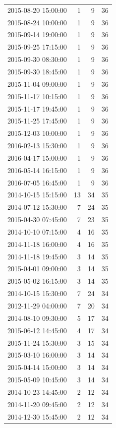 \begin{tabular}{lrrr}
2015-08-20 15:00:00 & 1 & 9 & 36 \\
2015-08-24 10:00:00 & 1 & 9 & 36 \\
2015-09-14 19:00:00 & 1 & 9 & 36 \\
2015-09-25 17:15:00 & 1 & 9 & 36 \\
2015-09-30 08:30:00 & 1 & 9 & 36 \\
2015-09-30 18:45:00 & 1 & 9 & 36 \\
2015-11-04 09:00:00 & 1 & 9 & 36 \\
2015-11-17 10:15:00 & 1 & 9 & 36 \\
2015-11-17 19:45:00 & 1 & 9 & 36 \\
2015-11-25 17:45:00 & 1 & 9 & 36 \\
2015-12-03 10:00:00 & 1 & 9 & 36 \\
2016-02-13 15:30:00 & 1 & 9 & 36 \\
2016-04-17 15:00:00 & 1 & 9 & 36 \\
2016-05-14 16:15:00 & 1 & 9 & 36 \\
2016-07-05 16:45:00 & 1 & 9 & 36 \\
2014-10-15 15:15:00 & 13 & 34 & 35 \\
2014-07-12 15:30:00 & 7 & 24 & 35 \\
2015-04-30 07:45:00 & 7 & 23 & 35 \\
2014-10-10 07:15:00 & 4 & 16 & 35 \\
2014-11-18 16:00:00 & 4 & 16 & 35 \\
2014-11-18 19:45:00 & 3 & 14 & 35 \\
2015-04-01 09:00:00 & 3 & 14 & 35 \\
2015-05-02 16:15:00 & 3 & 14 & 35 \\
2014-10-15 15:30:00 & 7 & 24 & 34 \\
2012-11-29 04:00:00 & 7 & 20 & 34 \\
2014-08-10 09:30:00 & 5 & 17 & 34 \\
2015-06-12 14:45:00 & 4 & 17 & 34 \\
2015-11-24 15:30:00 & 3 & 15 & 34 \\
2015-03-10 16:00:00 & 3 & 14 & 34 \\
2015-04-14 15:00:00 & 3 & 14 & 34 \\
2015-05-09 10:45:00 & 3 & 14 & 34 \\
2014-10-23 14:45:00 & 2 & 12 & 34 \\
2014-11-20 09:45:00 & 2 & 12 & 34 \\
2014-12-30 15:45:00 & 2 & 12 & 34 \\

\end{tabular}
